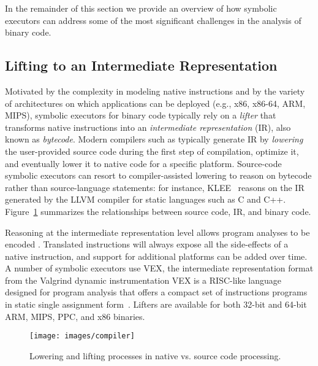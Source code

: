 In the remainder of this section we provide an overview of how symbolic executors can address some of the most significant challenges in the analysis of binary code.

\subsection{Lifting to an Intermediate Representation}
Motivated by the complexity in modeling native instructions and by the variety of architectures on which applications can be deployed (e.g., x86, x86-64, ARM, MIPS), symbolic executors for binary code typically rely on a {\em lifter} that transforms native instructions into an {\em intermediate representation} (IR), also known as {\em bytecode}. Modern compilers such as  typically generate IR by {\em lowering} the user-provided source code during the first step of compilation, optimize it, and eventually lower it to native code for a specific platform. Source-code symbolic executors can resort to compiler-assisted lowering to reason on bytecode rather than source-language statements: for instance, {\sc KLEE}~\cite{KLEE-OSDI08} reasons on the IR generated by the LLVM compiler for static languages such as C and C++. Figure~\ref{fig:lowering} summarizes the relationships between source code, IR, and binary code. %

Reasoning at the intermediate representation level allows program analyses to be encoded . Translated instructions will always expose all the side-effects of a native instruction, and support for additional platforms can be added over time. A number of symbolic executors use VEX, the intermediate representation format from the Valgrind dynamic instrumentation  VEX is a RISC-like language designed for program analysis that offers a compact set of instructions  programs in static single assignment form~\cite{SSA-TOPLAS91}. Lifters are available for both 32-bit and 64-bit ARM, MIPS, PPC, and x86 binaries.

\begin{figure}[t!]
  \centering
  \texttt{[image: images/compiler]} %
  \vspace{-2mm}
  \caption{\label{fig:lowering} Lowering and lifting processes in native vs. source code processing.}
  \vspace{-1mm} %
\end{figure}

